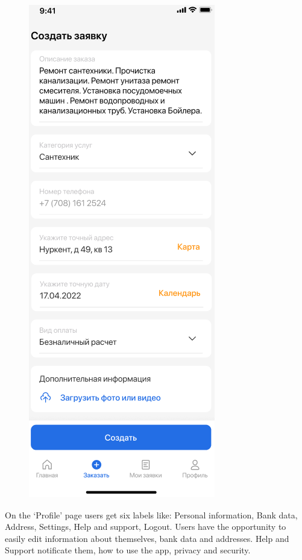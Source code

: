 \begin{figure}[H]
    \includegraphics[scale=0.70]{images/func7.png}
\end{figure}
On the ‘Profile’ page users get six labels like: Personal information, Bank data, Address, Settings, Help and support, Logout. Users have the opportunity to easily edit information about themselves, bank data and addresses. Help and Support notificate them, how to use the app, privacy and security.
